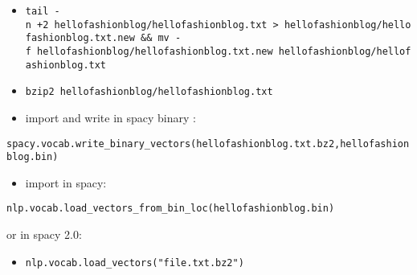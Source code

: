\documentclass[11pt]{article}
\providecommand{\tightlist}{%
      \setlength{\itemsep}{0pt}\setlength{\parskip}{0pt}}
\begin{document}
\begin{itemize}
\item
  \texttt{tail\ -n\ +2\ hellofashionblog/hellofashionblog.txt\ \textgreater{}\ hellofashionblog/hellofashionblog.txt.new\ \&\&\ mv\ -f\ hellofashionblog/hellofashionblog.txt.new\ hellofashionblog/hellofashionblog.txt}
\item
  \texttt{bzip2\ hellofashionblog/hellofashionblog.txt}
\item
  import and write in spacy binary :
\end{itemize}

\texttt{spacy.vocab.write\_binary\_vectors(\textquotesingle{}hellofashionblog.txt.bz2\textquotesingle{},\textquotesingle{}hellofashionblog.bin\textquotesingle{})}

\begin{itemize}
\tightlist
\item
  import in spacy:
\end{itemize}

\texttt{nlp.vocab.load\_vectors\_from\_bin\_loc(\textquotesingle{}hellofashionblog.bin\textquotesingle{})}

or in spacy 2.0:

\begin{itemize}
\tightlist
\item
  \texttt{nlp.vocab.load\_vectors("file.txt.bz2")}
\end{itemize}
\end{document}
